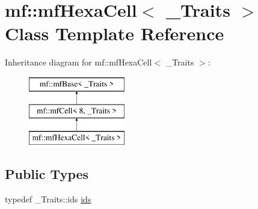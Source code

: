 \hypertarget{classmf_1_1mfHexaCell}{
\section{mf::mfHexaCell$<$ \_\-Traits $>$ Class Template Reference}
\label{classmf_1_1mfHexaCell}
}
Inheritance diagram for mf::mfHexaCell$<$ \_\-Traits $>$:\begin{figure}[H]
\begin{center}
\leavevmode
\includegraphics[height=3.000000cm]{classmf_1_1mfHexaCell}
\end{center}
\end{figure}
\subsection*{Public Types}
\begin{DoxyCompactItemize}
\item 
typedef \_\-Traits::ids \hyperlink{classmf_1_1mfHexaCell_a0f1d3a8aa5b31635f48c2d1baa1a9f37}{ids}
\end{DoxyCompactItemize}
